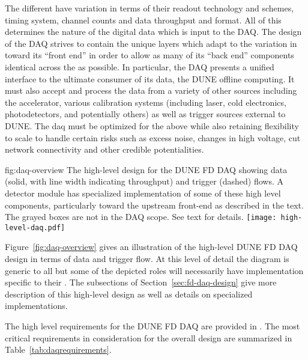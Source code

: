 The different  have variation in terms of their
readout technology and schemes, timing system, channel counts and data
throughput and format.
All of this determines the nature of the digital data which is input
to the DAQ. 
The design of the DAQ strives to contain the unique layers which adapt
to the variation in  toward its ``front end'' in
order to allow as many of its ``back end'' components identical across
the  as possible. 
In particular, the DAQ presents a unified interface to the ultimate
consumer of its data, the DUNE offline computing.
It must also accept and process the data from a variety of other
sources including the accelerator, various calibration systems
(including laser, cold electronics, photodetectors, and potentially
others) as well as trigger sources external to DUNE. 
The daq must be optimized for the above while also retaining
flexibility to scale to handle certain risks such as excess noise,
changes in high voltage, cut network connectivity and other credible
potentialities.

\begin{dunefigure}{fig:daq-overview}
  {The high-level design for the DUNE FD DAQ showing data (solid, with
    line width indicating throughput) and trigger (dashed) flows. 
    A detector module has specialized implementation of some of these
    high level components, particularly toward the upstream front-end
    as described in the text. 
    The grayed boxes are not in the DAQ scope.
    See text for details.
}
\texttt{[image: high-level-daq.pdf]}%
\end{dunefigure}


Figure~\ref{fig:daq-overview} gives an illustration of the high-level
DUNE FD DAQ design in terms of data and trigger flow.
At this level of detail the diagram is generic to all
 but some of the depicted roles will necessarily
have implementation specific to their .
The subsections of Section~\ref{sec:fd-daq-design} give more
description of this high-level design as well as details on
specialized implementations.

The high level requirements for the DUNE FD DAQ are provided in
\cite{daq:reqs}.
The most critical requirements in consideration for the overall design
are summarized in Table~\ref{tab:daqrequirements}.


